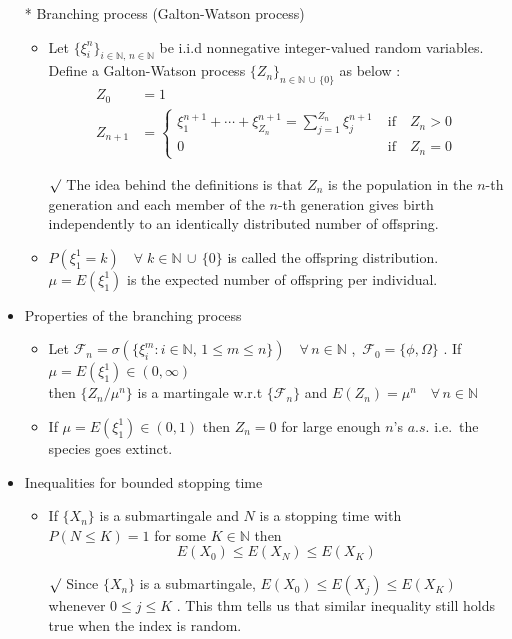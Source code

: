 \documentclass[12pt, A4]{article}
\newcommand{\rmk}{$\surd$}
\newcommand{\N}{\mathbb{N}}
\newcommand{\F}{\mathcal{F}}
\newcommand{\union}{\,\cup\,}
\newcommand{\foranyn}{\quad \forall \, n\in \N}
\begin{document}
\begin{itemize}
\begin{itemize}
	\end{itemize}
	\item[*] Branching process (Galton-Watson process)
	\begin{itemize}
		\item Let $\{\xi_i^n\}_{i\in \N,\, n\in \N}$ be i.i.d nonnegative integer-valued random variables. \\Define a Galton-Watson process $\{Z_n\}_{n\in \N\union \{0\}}$ as below : 
		\begin{align*}
			Z_0 &=1 \\
			Z_{n+1} &= \begin{cases}
				\xi_1^{n+1}+\cdots+\xi_{Z_n}^{n+1}=\sum_{j=1}^{Z_n}\xi_j^{n+1} & \;\text{if}\quad Z_n>0 \\
				0 & \;\text{if}\quad Z_n=0
			\end{cases}
		\end{align*}
		\item[\rmk] The idea behind the definitions is that $Z_n$ is the population in the $n$-th generation and each member of the $n$-th generation gives birth independently to an identically distributed number of offspring.
		\item $P(\xi_1^1=k)\quad \forall \;k\in\N\union\{0\}$ is called the offspring distribution. $\mu=E(\xi_1^1)$ is the expected number of offspring per individual.   
	\end{itemize}
	\item Properties of the branching process
	\begin{itemize}
		\item Let $\F_n=\sigma(\{\xi_i^m : i\in\N,\, 1\leq m\leq n\})\foranyn$ ,\, $\F_0=\{\phi, \Omega\}$ . If $\mu=E(\xi_1^1)\in (0,\infty)$ \\ then $\{Z_n/\mu^n\}$ is a martingale w.r.t $\{\F_n\}$ and $E(Z_n)=\mu^n\foranyn$
		\item If $\mu=E(\xi_1^1)\in(0,1)$ then $Z_n=0$ for large enough $n$'s $a.s.$ \;i.e.\, the species goes extinct.
	\end{itemize}
	\item Inequalities for bounded stopping time
	\begin{itemize}
		\item If $\{X_n\}$ is a submartingale and $N$ is a stopping time with $P(N\leq K)=1$ for some $K\in \N$ then $$E(X_0)\leq E(X_N)\leq E(X_K) $$
		\item[\rmk] Since $\{X_n\}$ is a submartingale, $E(X_0)\leq E(X_j)\leq E(X_K)$ whenever $0\leq j\leq K$ . This thm tells us that similar inequality still holds true when the index is random. 

\end{itemize}
\end{itemize}
\end{document}
